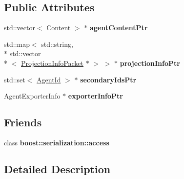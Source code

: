 \subsection*{Public Attributes}
\begin{DoxyCompactItemize}
\item 
\hypertarget{classrepast_1_1_sync_status___packet_a0f1b41c38b88b98c9d22ef3432c4a061}{std\-::vector$<$ Content $>$ $\ast$ {\bfseries agent\-Content\-Ptr}}\label{classrepast_1_1_sync_status___packet_a0f1b41c38b88b98c9d22ef3432c4a061}

\item 
\hypertarget{classrepast_1_1_sync_status___packet_a98f79861c72954a2df739180a92cad93}{std\-::map$<$ std\-::string, \\*
std\-::vector\\*
$<$ \hyperlink{classrepast_1_1_projection_info_packet}{Projection\-Info\-Packet} $\ast$ $>$ $>$ $\ast$ {\bfseries projection\-Info\-Ptr}}\label{classrepast_1_1_sync_status___packet_a98f79861c72954a2df739180a92cad93}

\item 
\hypertarget{classrepast_1_1_sync_status___packet_a5eb0e514a91cafa6e401833ad3ad682e}{std\-::set$<$ \hyperlink{classrepast_1_1_agent_id}{Agent\-Id} $>$ $\ast$ {\bfseries secondary\-Ids\-Ptr}}\label{classrepast_1_1_sync_status___packet_a5eb0e514a91cafa6e401833ad3ad682e}

\item 
\hypertarget{classrepast_1_1_sync_status___packet_aee5fd7841eaefb9e66be94aef24e2d36}{Agent\-Exporter\-Info $\ast$ {\bfseries exporter\-Info\-Ptr}}\label{classrepast_1_1_sync_status___packet_aee5fd7841eaefb9e66be94aef24e2d36}

\end{DoxyCompactItemize}
\subsection*{Friends}
\begin{DoxyCompactItemize}
\item 
\hypertarget{classrepast_1_1_sync_status___packet_ac98d07dd8f7b70e16ccb9a01abf56b9c}{class {\bfseries boost\-::serialization\-::access}}\label{classrepast_1_1_sync_status___packet_ac98d07dd8f7b70e16ccb9a01abf56b9c}

\end{DoxyCompactItemize}


\subsection{Detailed Description}

